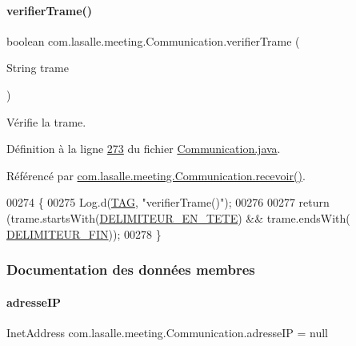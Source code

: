 \paragraph{\texorpdfstring{verifier\+Trame()}{verifierTrame()}}
{\footnotesize\ttfamily boolean com.\+lasalle.\+meeting.\+Communication.\+verifier\+Trame (\begin{DoxyParamCaption}\item[{String}]{trame }\end{DoxyParamCaption})}



Vérifie la trame. 



Définition à la ligne \hyperlink{_communication_8java_source_l00273}{273} du fichier \hyperlink{_communication_8java_source}{Communication.\+java}.



Référencé par \hyperlink{_communication_8java_source_l00132}{com.\+lasalle.\+meeting.\+Communication.\+recevoir()}.


\begin{DoxyCode}
00274     \{
00275         Log.d(\hyperlink{classcom_1_1lasalle_1_1meeting_1_1_communication_a5d58f88df1f20b4d61edbed9a82eccab}{TAG}, \textcolor{stringliteral}{"verifierTrame()"});
00276 
00277         \textcolor{keywordflow}{return} (trame.startsWith(\hyperlink{classcom_1_1lasalle_1_1meeting_1_1_communication_a6560c39bb7ebc968e007e4dd98ec296c}{DELIMITEUR\_EN\_TETE}) && trame.endsWith(
      \hyperlink{classcom_1_1lasalle_1_1meeting_1_1_communication_a6f2e7cb2145496069cdf1b33d017be58}{DELIMITEUR\_FIN}));
00278     \}
\end{DoxyCode}


\subsubsection{Documentation des données membres}
\mbox{\label{classcom_1_1lasalle_1_1meeting_1_1_communication_a46e5fbc8ec97ad651d544e09121a6468}} 
\paragraph{\texorpdfstring{adresse\+IP}{adresseIP}}
{\footnotesize\ttfamily Inet\+Address com.\+lasalle.\+meeting.\+Communication.\+adresse\+IP = null\hspace{0.3cm}{\ttfamily [private]}}

